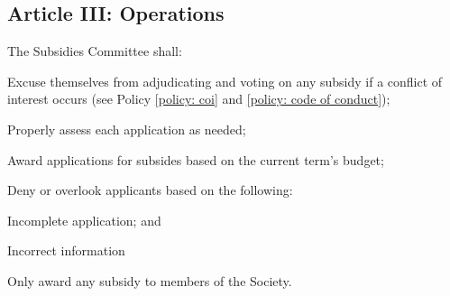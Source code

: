 \subsection{Article III: Operations}
\begin{longenum}[ label*=\thesubsection.\arabic*., align=left] 
	\item The Subsidies Committee shall:	
		\begin{longenum}[ label*=\arabic*., align=left] 
		\item Excuse themselves from adjudicating and voting on any subsidy if a conflict of interest occurs (see Policy \ref{policy: coi} and \ref{policy: code of conduct});
		\item Properly assess each application as needed;
		\item Award applications for subsides based on the current term’s budget;
		\item Deny or overlook applicants based on the following:
			\begin{longenum}[ label*=\arabic*., align=left]
			\item Incomplete application; and
			\item Incorrect information
			\end{longenum}
		\item Only award any subsidy to members of the Society.	
		\end{longenum}
\end{longenum}

